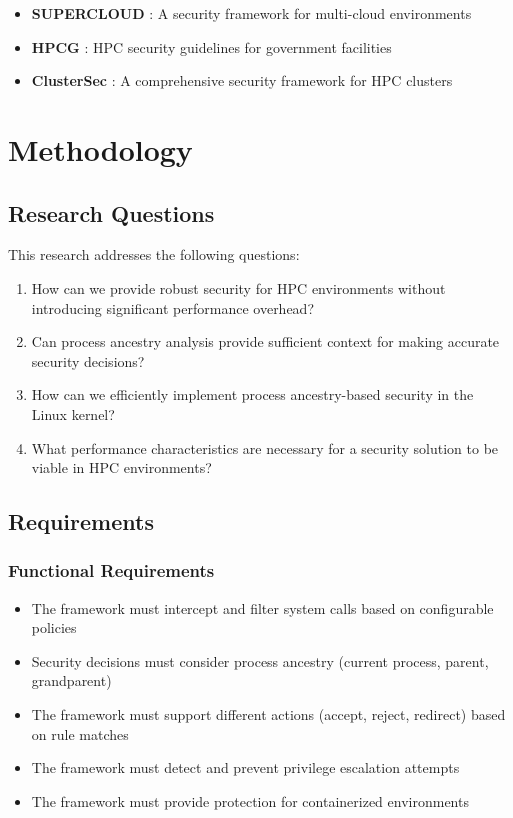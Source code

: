 \documentclass[conference]{IEEEtran}
\begin{document}
\begin{itemize}
\item \textbf{SUPERCLOUD} \cite{wailly2018supercloud}: A security framework for multi-cloud environments
\item \textbf{HPCG} \cite{nist2018security}: HPC security guidelines for government facilities
\item \textbf{ClusterSec} \cite{johnson2020clustersec}: A comprehensive security framework for HPC clusters
\end{itemize}\section{Methodology}
\label{sec:methodology}

\subsection{Research Questions}
This research addresses the following questions:

\begin{enumerate}
\item How can we provide robust security for HPC environments without introducing significant performance overhead?
\item Can process ancestry analysis provide sufficient context for making accurate security decisions?
\item How can we efficiently implement process ancestry-based security in the Linux kernel?
\item What performance characteristics are necessary for a security solution to be viable in HPC environments?
\end{enumerate}

\subsection{Requirements}

\subsubsection{Functional Requirements}
\begin{itemize}
\item The framework must intercept and filter system calls based on configurable policies
\item Security decisions must consider process ancestry (current process, parent, grandparent)
\item The framework must support different actions (accept, reject, redirect) based on rule matches
\item The framework must detect and prevent privilege escalation attempts
\item The framework must provide protection for containerized environments
\end{itemize}
\end{document}
